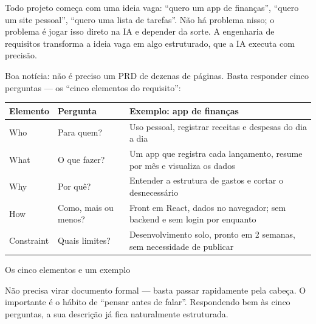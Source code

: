 


Todo projeto começa com uma ideia vaga: “quero um app de finanças”, “quero um site pessoal”, “quero uma lista de tarefas”. Não há problema nisso; o problema é jogar isso direto na IA e depender da sorte. A engenharia de requisitos transforma a ideia vaga em algo estruturado, que a IA executa com precisão.

Boa notícia: não é preciso um PRD de dezenas de páginas. Basta responder cinco perguntas — os “cinco elementos do requisito”:

\begin{center}
\begin{tabularx}{\linewidth}{|X|X|X|}
\hline
\textbf{Elemento} & \textbf{Pergunta} & \textbf{Exemplo: app de finanças} \tabularnewline
\hline
Who & Para quem? & Uso pessoal, registrar receitas e despesas do dia a dia \tabularnewline
What & O que fazer? & Um app que registra cada lançamento, resume por mês e visualiza os dados \tabularnewline
Why & Por quê? & Entender a estrutura de gastos e cortar o desnecessário \tabularnewline
How & Como, mais ou menos? & Front em React, dados no navegador; sem backend e sem login por enquanto \tabularnewline
Constraint & Quais limites? & Desenvolvimento solo, pronto em 2 semanas, sem necessidade de publicar \tabularnewline
\hline
\end{tabularx}
\end{center}

\begin{center}\small\color{gray}Os cinco elementos e um exemplo\end{center}

Não precisa virar documento formal — basta passar rapidamente pela cabeça. O importante é o hábito de “pensar antes de falar”. Respondendo bem às cinco perguntas, a sua descrição já fica naturalmente estruturada.


